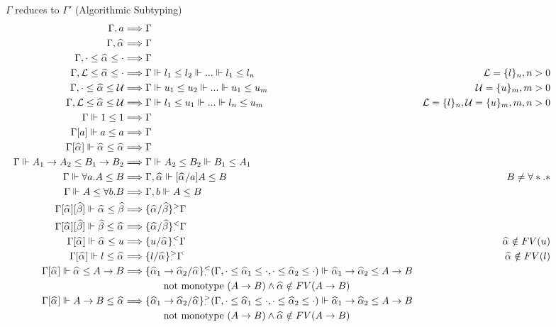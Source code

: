 \documentclass{article}
\theoremstyle{definition}
\newcommand{\all}[1]{\forall #1.}
\begin{document}
\begin{figure}[htp]
{\small 
\phantom{phantom} \hfill {} \hfill $\Gamma$ reduces to $\Gamma'$ (Algorithmic Subtyping)
		$$\begin{aligned}
			\Gamma, a &\Longrightarrow \Gamma \\
			\Gamma, \al &\Longrightarrow \Gamma \\
			\Gamma, \cdot \le \al \le \cdot &\Longrightarrow \Gamma \\
			\Gamma, \mathcal{L}\le \al \le \cdot &\Longrightarrow \Gamma \Vdash l_1 \le l_2 \Vdash ... \Vdash l_1 \le l_n \qquad &\mathcal{L}=\{l\}_n, n>0\\
			\Gamma, \cdot\le \al \le\mathcal{U} &\Longrightarrow \Gamma \Vdash u_1 \le u_2 \Vdash ... \Vdash u_1 \le u_m  \qquad &\mathcal{U}=\{u\}_m, m>0\\
			\Gamma, \mathcal{L}\le \al \le\mathcal{U} &\Longrightarrow \Gamma \Vdash l_1 \le u_1 \Vdash ... \Vdash l_n \le u_m  & \mathcal{L}=\{l\}_n, \mathcal{U}=\{u\}_m, m, n > 0\\
			\Gamma \Vdash 1\le 1 &\Longrightarrow \Gamma\\
			\Gamma[a] \Vdash a\le a &\Longrightarrow \Gamma\\
			\Gamma[\al] \Vdash \al\le \al &\Longrightarrow \Gamma\\
			\Gamma \Vdash A_1\to A_2 \le B_1\to B_2 &\Longrightarrow \Gamma \Vdash A_2 \le B_2 \Vdash B_1\le A_1\\
			\Gamma \Vdash \all a A\le B &\Longrightarrow \Gamma,\al \Vdash [\al/a]A\le B & B \neq \all * *\\
			\Gamma \Vdash A\le \all b B &\Longrightarrow \Gamma,b \Vdash A\le B\\
			\Gamma[\al][\bt] \Vdash \al \le \bt  &\Longrightarrow
			\{\al/\bt\}^>_{\cdot}\Gamma \\
			\Gamma[\al][\bt] \Vdash \bt \le \al  &\Longrightarrow \{\al/\bt\}^<_{\cdot}\Gamma \\
			\Gamma[\al] \Vdash \al\le u &\Longrightarrow \{u/\al\}^<_{\cdot}\Gamma &\al \notin FV(u) \\
			\Gamma[\al] \Vdash  l \le \al &\Longrightarrow \{l/\al\}^>_{\cdot}\Gamma &\al \notin FV(l)\\
            \Gamma[\al] \Vdash \al \le A\to B &\Longrightarrow \{\al[1] \to \al[2] / \al\}_{\cdot}^<(\Gamma, \cdot\le \al[1]\le\cdot, \cdot\le \al[2]\le\cdot)\Vdash \al[1] \to \al[2] \le A \to B\\
            &\qquad\qquad\text{not monotype } (A\to B) \wedge \al \notin FV(A \to B)\\
            \Gamma[\al] \Vdash  A\to B\le\al &\Longrightarrow \{\al[1] \to\al[2]/\al\}_{\cdot}^>(\Gamma, \cdot\le\al[1]\le\cdot, \cdot\le\al[2]\le\cdot) \Vdash \al[1] \to \al[2] \le A \to B\\
            &\qquad\qquad\text{not monotype } (A\to B) \wedge \al \notin FV(A \to B)\\
		\end{aligned}
		$$
}
\end{figure}
\end{document}
